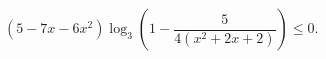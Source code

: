\begin{ex}[type=inequality]
	\begin{condition}
		$ (5 - 7x - 6x^2)\log_3\left(1 - \dfrac{5}{4(x^2 + 2x + 2)}\right)\leqslant0 .$
	\end{condition}
\end{ex}